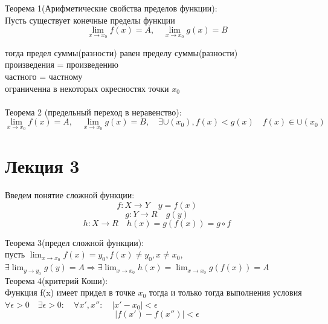 \documentclass[a4paper, 12pt]{article}
\begin{document}
\begin{mdframed}[backgroundcolor=blue!20] 
       Теорема 1(Арифметические свойства пределов функции): \\
       Пусть существует конечные пределы функции \[
       	\lim_{x\to x_0} f(x) = A, \quad \lim_{x\to x_0} g(x) = B
       \]

       тогда предел суммы(разности) равен пределу суммы(разности)\\
       произведения = произведению\\
       частного = частному\\
       ограниченна в некоторых окресностях точки $ x_0 $\\ \\ 

       Теорема 2 (предельный переход в неравенство):\\
       \[
       		\lim_{x\to x_0} f(x) = A, \quad \lim_{x\to x_0} g(x) = B, \quad \exists \cup(x_0),f(x)<g(x) \quad f(x) \in \cup(x_0)
       \]

       


    \end{mdframed}



\section*{Лекция 3}


Введем понятие сложной функции:\[
  f:X \to Y \quad y = f(x)
\]
\[
  g:Y \to R \quad g(y)
\]
\[
  h:X \to R \quad h(x) = g(f(x))= g \circ f
\]

\begin{mdframed}[backgroundcolor=blue!20] 
       Теорема 3(предел сложной функции):\\
       пусть $ \lim_{x\to x_0} f(x) = y_0, f(x) \neq y_0 ,x \neq x_0  $, $ \exists \lim_{y\to y_0} g(y) = A \Rightarrow \exists \lim_{x\to x_0}h(x) = \lim_{x\to x_0} g(f(x)) = A    $\\

       Теорема 4(критерий Коши):\\
       Функция f(x) имеет придел в точке $ x_0 $  тогда и только тогда выполнения условия $ \forall \epsilon > 0 \quad \exists \epsilon > 0 : \quad \forall x',x'': \quad |x' - x_0|<\epsilon $ \\
       \[
         |f(x') - f(x'')| < \epsilon
       \]

    \end{mdframed}
\end{document}
